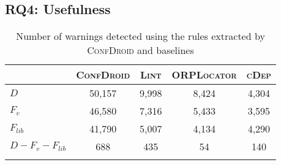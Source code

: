 \subsection{RQ4: Usefulness}
\begin{table}[t]
	\caption{{Number of warnings detected using the rules extracted by
	\textsc{ConfDroid} and baselines}}
	\centering
\begin{center}
		\begin{tabular}{lcccc}
\toprule
 &  {\centering \textsc{ConfDroid}} &  {\centering \textsc{Lint}}  & \textsc{ORPLocator} {\centering} & \textsc{cDep} \\ \hline
$D$&50,157&9,998&8,424&4,304\\
$F_{v}$ & 46,580  & 7,316 & 5,433 & 3,595 \\
$F_{lib}$ & 41,790 & 5,007 & 4,134 & 4,290 \\
$D-F_{v}-F_{lib}$ & 688 & 435 &  54& 140 \\
 \bottomrule
\label{tab:issuedetection}	\end{tabular}

\end{center}

\end{table}

